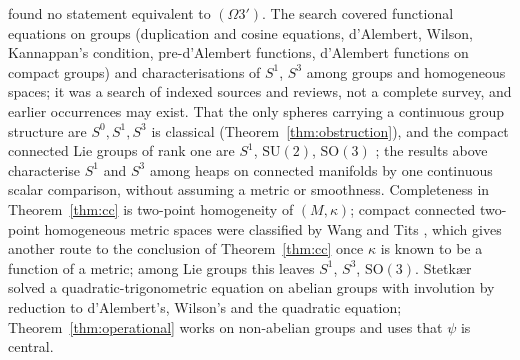 \documentclass[11pt,reqno]{amsart}
\theoremstyle{definition}
\theoremstyle{remark}
\numberwithin{equation}{section}
\newcommand{\SU}{\mathrm{SU}}
\newcommand{\SO}{\mathrm{SO}}
\begin{document}
found no statement equivalent to $(\Omega3')$.  The search covered functional equations on groups
(duplication and cosine equations, d'Alembert, Wilson, Kannappan's condition, pre-d'Alembert functions, d'Alembert
functions on compact groups) and characterisations of $S^1$, $S^3$ among groups and homogeneous spaces; it was a
search of indexed sources and reviews, not a complete survey, and earlier occurrences may exist.  That the only spheres
carrying a continuous group structure are $S^0,S^1,S^3$ is classical \cite{Samelson40} (Theorem~\ref{thm:obstruction}), and the
compact connected Lie groups of rank one are $S^1$, $\SU(2)$, $\SO(3)$ \cite{Samelson40,Knapp}; the results above characterise $S^1$ and $S^3$
among heaps on connected manifolds by one continuous scalar comparison, without assuming a metric or smoothness.
Completeness in Theorem~\ref{thm:cc} is two-point homogeneity of $(M,\kappa)$; compact connected two-point homogeneous
metric spaces were classified by Wang \cite{Wang52} and Tits \cite{Tits55}, which gives another route to the conclusion of
Theorem~\ref{thm:cc} once $\kappa$ is known to be a function of a metric; among Lie groups this leaves $S^1$, $S^3$, $\SO(3)$.
Stetk\ae r \cite{Stetkaer98} solved a quadratic-trigonometric equation on abelian groups with involution by reduction to
d'Alembert's, Wilson's and the quadratic equation; Theorem~\ref{thm:operational} works on non-abelian groups and uses that
$\psi$ is central.
\end{document}
